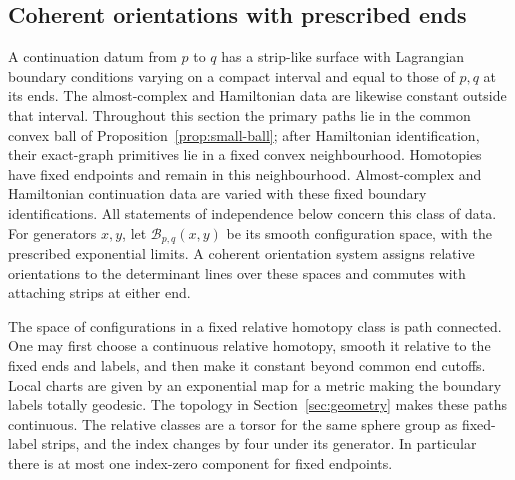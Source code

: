 \documentclass[11pt]{amsart}
\theoremstyle{definition}
\theoremstyle{remark}
\theoremstyle{plain}
\numberwithin{equation}{section}
\begin{document}
\subsection{Coherent orientations with prescribed ends}
A continuation datum from $p$ to $q$ has a strip-like
surface with Lagrangian boundary conditions varying
on a compact interval and equal to those of $p,q$
at its ends. The almost-complex and Hamiltonian
data are likewise constant outside that interval.
Throughout this section the primary paths lie in the common convex
ball of Proposition~\ref{prop:small-ball}; after Hamiltonian
identification, their exact-graph primitives lie in a fixed convex
neighbourhood. Homotopies have fixed endpoints and remain in this
neighbourhood. Almost-complex and Hamiltonian continuation data are
varied with these fixed boundary identifications. All statements of
independence below concern this class of data.
For generators $x,y$, let $\mathcal B_{p,q}(x,y)$
be its smooth configuration space, with the
prescribed exponential limits. A coherent
orientation system assigns relative orientations
to the determinant lines over these spaces and
commutes with attaching strips at either end.

The space of configurations in a fixed relative
homotopy class is path connected. One may first
choose a continuous relative homotopy, smooth it
relative to the fixed ends and labels, and then
make it constant beyond common end cutoffs. Local
charts are given by an exponential map for a
metric making the boundary labels totally
geodesic. The topology in
Section~\ref{sec:geometry} makes these paths
continuous. The relative classes are a torsor
for the same sphere group as fixed-label strips,
and the index changes by four under its generator.
In particular there is at most one index-zero
component for fixed endpoints.
\end{document}
